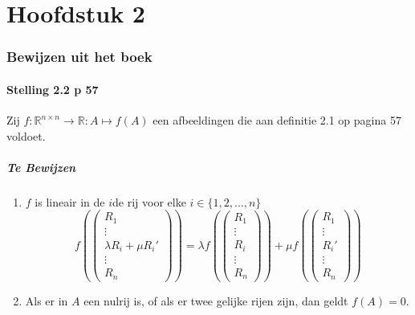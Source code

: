 \documentclass[lineaire_algebra_oplossingen.tex]{subfiles}
\begin{document}
\part{Hoofdstuk 2}
\section{Bewijzen uit het boek}
\subsection{Stelling 2.2 p 57}
Zij $f : \mathbb{R}^{n\times n} \rightarrow \mathbb{R}:A\mapsto f(A)$ een afbeeldingen die aan definitie 2.1 op pagina 57 voldoet.
\subsubsection*{Te Bewijzen}
\begin{enumerate}
\item $f$ is lineair in de $i$de rij voor elke $i\in \{1,2,...,n\}$
\[
f\left(
\begin{pmatrix}
R_1 \\ \vdots \\ \lambda R_i + \mu R_i' \\ \vdots \\R_n
\end{pmatrix}
\right)
=
\lambda
f\left(
\begin{pmatrix}
R_1 \\ \vdots \\ R_i\\\vdots \\R_n
\end{pmatrix}
\right)
+
\mu 
f
\left(
\begin{pmatrix}
R_1 \\ \vdots \\ R_i' \\\vdots \\R_n
\end{pmatrix}
\right)
\] 
\item Als er in $A$ een nulrij is, of als er twee gelijke rijen zijn, dan geldt $f(A)=0$.
\end{enumerate}
\end{document}
